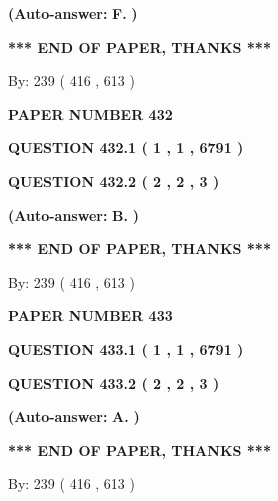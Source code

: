 \documentclass[12pt]{article}
\begin{document}
 
{\textbf{(Auto-answer:}}
{\textbf{\large{
F.}}}
{\textbf{)}}
 
 
   
   
   
   
\vspace{1.0in} 
{\textbf{\large{ *** END OF PAPER, THANKS *** }}} 
   
   
\hspace{1.0in} By: 
 239 ( 416 ,  613 )
   
   
   
   
\newpage 
\setcounter{page}{ 
   432001 } 
   
   
 {\textbf{ \Large{ PAPER NUMBER  432  }}}
   
   
   
   
  
  
{\textbf{\large{QUESTION
432.1 
 ( 1 , 1 , 6791 )
}}}
  
  
{\textbf{\large{QUESTION
432.2 
 ( 2 , 2 , 3 )
}}}
 
 
{\textbf{(Auto-answer:}}
{\textbf{\large{
B.}}}
{\textbf{)}}
 
 
   
   
   
   
\vspace{1.0in} 
{\textbf{\large{ *** END OF PAPER, THANKS *** }}} 
   
   
\hspace{1.0in} By: 
 239 ( 416 ,  613 )
   
   
   
   
\newpage 
\setcounter{page}{ 
   433001 } 
   
   
 {\textbf{ \Large{ PAPER NUMBER  433  }}}
   
   
   
   
  
  
{\textbf{\large{QUESTION
433.1 
 ( 1 , 1 , 6791 )
}}}
  
  
{\textbf{\large{QUESTION
433.2 
 ( 2 , 2 , 3 )
}}}
 
 
{\textbf{(Auto-answer:}}
{\textbf{\large{
A.}}}
{\textbf{)}}
 
 
   
   
   
   
\vspace{1.0in} 
{\textbf{\large{ *** END OF PAPER, THANKS *** }}} 
   
   
\hspace{1.0in} By: 
 239 ( 416 ,  613 )
   
   
   
   
\newpage 
\setcounter{page}{ 
   434001 } 
   
\end{document}
